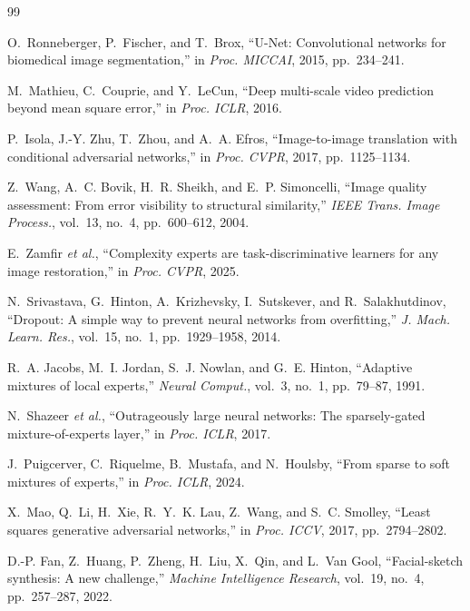 \documentclass[journal]{IEEEtran}
\begin{document}
\begin{thebibliography}{99}

O.~Ronneberger, P.~Fischer, and T.~Brox, ``U-Net: Convolutional networks for biomedical image segmentation,'' in \emph{Proc. MICCAI}, 2015, pp.~234--241.

M.~Mathieu, C.~Couprie, and Y.~LeCun, ``Deep multi-scale video prediction beyond mean square error,'' in \emph{Proc. ICLR}, 2016.

P.~Isola, J.-Y. Zhu, T.~Zhou, and A.~A. Efros, ``Image-to-image translation with conditional adversarial networks,'' in \emph{Proc. CVPR}, 2017, pp.~1125--1134.

Z.~Wang, A.~C. Bovik, H.~R. Sheikh, and E.~P. Simoncelli, ``Image quality assessment: From error visibility to structural similarity,'' \emph{IEEE Trans. Image Process.}, vol.~13, no.~4, pp.~600--612, 2004.

E.~Zamfir \emph{et al.}, ``Complexity experts are task-discriminative learners for any image restoration,'' in \emph{Proc. CVPR}, 2025.

N.~Srivastava, G.~Hinton, A.~Krizhevsky, I.~Sutskever, and R.~Salakhutdinov, ``Dropout: A simple way to prevent neural networks from overfitting,'' \emph{J. Mach. Learn. Res.}, vol.~15, no.~1, pp.~1929--1958, 2014.

R.~A. Jacobs, M.~I. Jordan, S.~J. Nowlan, and G.~E. Hinton, ``Adaptive mixtures of local experts,'' \emph{Neural Comput.}, vol.~3, no.~1, pp.~79--87, 1991.

N.~Shazeer \emph{et al.}, ``Outrageously large neural networks: The sparsely-gated mixture-of-experts layer,'' in \emph{Proc. ICLR}, 2017.

J.~Puigcerver, C.~Riquelme, B.~Mustafa, and N.~Houlsby, ``From sparse to soft mixtures of experts,'' in \emph{Proc. ICLR}, 2024.

X.~Mao, Q.~Li, H.~Xie, R.~Y.~K. Lau, Z.~Wang, and S.~C. Smolley, ``Least squares generative adversarial networks,'' in \emph{Proc. ICCV}, 2017, pp.~2794--2802.

D.-P. Fan, Z.~Huang, P.~Zheng, H.~Liu, X.~Qin, and L.~Van Gool, ``Facial-sketch synthesis: A new challenge,'' \emph{Machine Intelligence Research}, vol.~19, no.~4, pp.~257--287, 2022.


\end{thebibliography}
\end{document}
